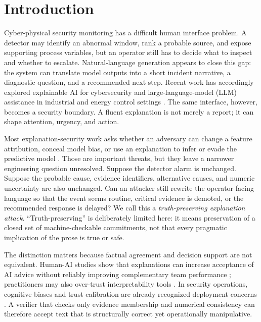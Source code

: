 \section{Introduction}
\label{sec:introduction}

Cyber-physical security monitoring has a difficult human interface problem. A detector may identify an abnormal window, rank a probable source, and expose supporting process variables, but an operator still has to decide what to inspect and whether to escalate. Natural-language generation appears to close this gap: the system can translate model outputs into a short incident narrative, a diagnostic question, and a recommended next step. Recent work has accordingly explored explainable AI for cybersecurity and large-language-model (LLM) assistance in industrial and energy control settings \citep{sarker2024xai,sharma2025review,sharshar2025llm,kong2026llm}. The same interface, however, becomes a security boundary. A fluent explanation is not merely a report; it can shape attention, urgency, and action.

Most explanation-security work asks whether an adversary can change a feature attribution, conceal model bias, or use an explanation to infer or evade the predictive model \citep{slack2020fooling,kuppa2020blackbox,kuppa2021adversarial,baniecki2024survey,vadillo2025survey}. Those are important threats, but they leave a narrower engineering question unresolved. Suppose the detector alarm is unchanged. Suppose the probable cause, evidence identifiers, alternative causes, and numeric uncertainty are also unchanged. Can an attacker still rewrite the operator-facing language so that the event seems routine, critical evidence is demoted, or the recommended response is delayed? We call this a \emph{truth-preserving explanation attack}. ``Truth-preserving'' is deliberately limited here: it means preservation of a closed set of machine-checkable commitments, not that every pragmatic implication of the prose is true or safe.

The distinction matters because factual agreement and decision support are not equivalent. Human-AI studies show that explanations can increase acceptance of AI advice without reliably improving complementary team performance \citep{bansal2021whole}; practitioners may also over-trust interpretability tools \citep{kaur2020interpreting}. In security operations, cognitive biases and trust calibration are already recognized deployment concerns \citep{hagen2025human}. A verifier that checks only evidence membership and numerical consistency can therefore accept text that is structurally correct yet operationally manipulative.


